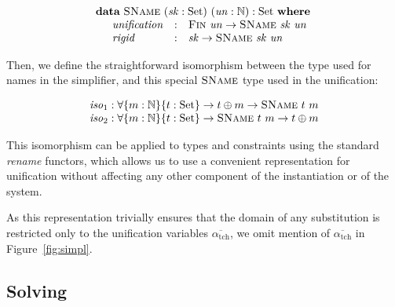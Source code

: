 \documentclass[a4paper]{jfp}
\begin{document}
\begin{displaymath}
   \begin{array}{l}
   \textbf{data}\ \textsc{SName}\ (\mathit{sk} : \text{Set})\ (\mathit{un} : \mathbb{N}) : \text{Set}\ \textbf{where} \\
   \quad \begin{array}{lll}
      \mathit{unification} & : & \textsc{Fin}\ \mathit{un} \rightarrow \textsc{SName}\ \mathit{sk}\ \mathit{un} \\
      \mathit{rigid}       & : & \mathit{sk} \rightarrow \textsc{SName}\ \mathit{sk}\ \mathit{un}
    \end{array}
   \end{array}
\end{displaymath}

Then, we define the straightforward isomorphism between the type used for names in the simplifier, and this special $\textsc{SName}$ type used in the
unification:

\begin{displaymath}
   \begin{array}{l}
      \mathit{iso}_1 : \forall \{m : \mathbb{N}\}\{t : \text{Set} \} \rightarrow t \oplus m \rightarrow \textsc{SName}\ t\ m \\
      \mathit{iso}_2 : \forall \{m : \mathbb{N}\}\{t : \text{Set} \} \rightarrow \textsc{SName}\ t\ m \rightarrow t \oplus m
   \end{array}
\end{displaymath}

This isomorphism can be applied to types and constraints using the standard \emph{rename} functors, which allows us to use a convenient 
representation for unification without affecting any other component of the instantiation or of the system.

As this representation trivially ensures that the domain of any substitution is restricted only to the unification variables
$\overline{\alpha_\text{tch}}$, we omit mention of $\overline{\alpha_\text{tch}}$ in Figure~\ref{fig:simpl}.

\subsection{Solving}
\end{document}
